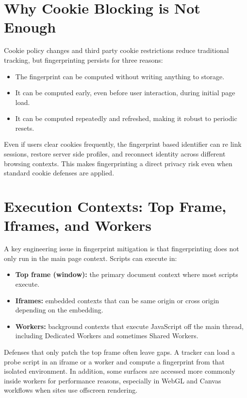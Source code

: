 \documentclass[11pt]{report}
\begin{document}
\section{Why Cookie Blocking is Not Enough}

Cookie policy changes and third party cookie restrictions reduce traditional tracking, but fingerprinting persists for three reasons:

\begin{itemize}
    \item The fingerprint can be computed without writing anything to storage.
    \item It can be computed early, even before user interaction, during initial page load.
    \item It can be computed repeatedly and refreshed, making it robust to periodic resets.
\end{itemize}

Even if users clear cookies frequently, the fingerprint based identifier can re link sessions, restore server side profiles, and reconnect identity across different browsing contexts. This makes fingerprinting a direct privacy risk even when standard cookie defenses are applied.

\section{Execution Contexts: Top Frame, Iframes, and Workers}

A key engineering issue in fingerprint mitigation is that fingerprinting does not only run in the main page context. Scripts can execute in:

\begin{itemize}
    \item \textbf{Top frame (window):} the primary document context where most scripts execute.
    \item \textbf{Iframes:} embedded contexts that can be same origin or cross origin depending on the embedding.
    \item \textbf{Workers:} background contexts that execute JavaScript off the main thread, including Dedicated Workers and sometimes Shared Workers.
\end{itemize}

Defenses that only patch the top frame often leave gaps. A tracker can load a probe script in an iframe or a worker and compute a fingerprint from that isolated environment. In addition, some surfaces are accessed more commonly inside workers for performance reasons, especially in WebGL and Canvas workflows when sites use offscreen rendering.
\end{document}
